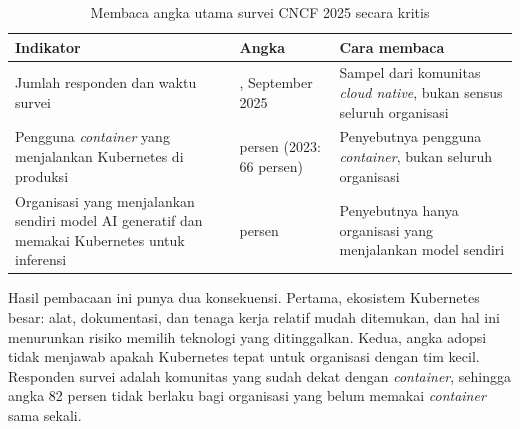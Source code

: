 \begin{table}[!htb]
  \centering
  \caption{Membaca angka utama survei CNCF 2025 secara kritis}
  \label{tab:ch08-survei-cncf}
  \footnotesize
  \begin{tabularx}{\textwidth}{>{\raggedright\arraybackslash}X >{\raggedright\arraybackslash}p{2.0cm}
      >{\raggedright\arraybackslash}X}
    \hline
    \textbf{Indikator} & \textbf{Angka} & \textbf{Cara membaca} \\ \hline
    Jumlah responden dan waktu survei & 628, September 2025 & Sampel dari komunitas
      \textit{cloud native}, bukan sensus seluruh organisasi \\ \hline
    Pengguna \textit{container} yang menjalankan Kubernetes di produksi & 82 persen (2023: 66
      persen) & Penyebutnya pengguna \textit{container}, bukan seluruh organisasi \\ \hline
    Organisasi yang menjalankan sendiri model AI generatif dan memakai Kubernetes untuk inferensi &
      66 persen & Penyebutnya hanya organisasi yang menjalankan model sendiri \\ \hline
  \end{tabularx}
\end{table}

Hasil pembacaan ini punya dua konsekuensi. Pertama, ekosistem Kubernetes besar: alat, dokumentasi,
dan tenaga kerja relatif mudah ditemukan, dan hal ini menurunkan risiko memilih teknologi yang
ditinggalkan. Kedua, angka adopsi tidak menjawab apakah Kubernetes tepat untuk organisasi dengan
tim kecil. Responden survei adalah komunitas yang sudah dekat dengan \textit{container}, sehingga
angka 82 persen tidak berlaku bagi organisasi yang belum memakai \textit{container} sama sekali.

